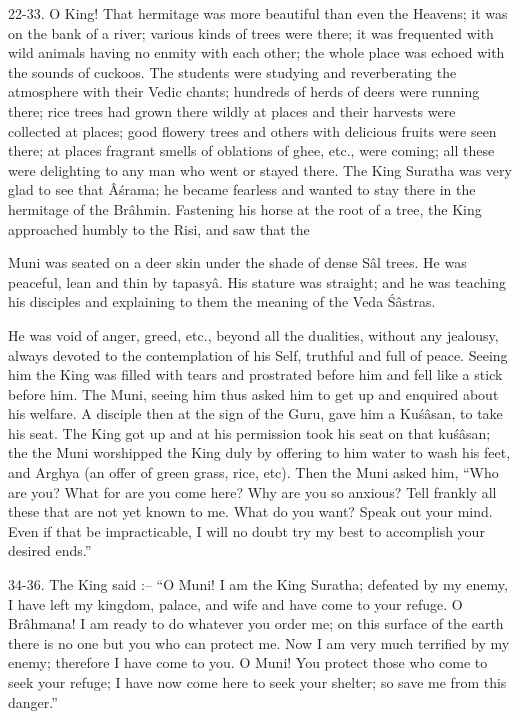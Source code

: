 22-33. O King! That hermitage was more beautiful than even the Heavens; it was on the bank of a river; various kinds of trees were there; it was frequented with wild animals having no enmity with each other; the whole place was echoed with the sounds of cuckoos. The students were studying and reverberating the atmosphere with their Vedic chants; hundreds of herds of deers were running there; rice trees had grown there wildly at places and their harvests were collected at places; good flowery trees and others with delicious fruits were seen there; at places fragrant smells of oblations of ghee, etc., were coming; all these were delighting to any man who went or stayed there. The King Suratha was very glad to see that \^A\'srama; he became fearless and wanted to stay there in the hermitage of the Br\^ahmin. Fastening his horse at the root of a tree, the King approached humbly to the Risi, and saw that the

Muni was seated on a deer skin under the shade of dense S\^al trees. He was peaceful, lean and thin by tapasy\^a. His stature was straight; and he was teaching his disciples and explaining to them the meaning of the Veda \'S\^astras.

He was void of anger, greed, etc., beyond all the dualities, without any jealousy, always devoted to the contemplation of his Self, truthful and full of peace. Seeing him the King was filled with tears and prostrated before him and fell like a stick before him. The Muni, seeing him thus asked him to get up and enquired about his welfare. A disciple then at the sign of the Guru, gave him a Ku\'s\^asan, to take his seat. The King got up and at his permission took his seat on that ku\'s\^asan; the the Muni worshipped the King duly by offering to him water to wash his feet, and Arghya (an offer of green grass, rice, etc). Then the Muni asked him, ``Who are you? What for are you come here? Why are you so anxious? Tell frankly all these that are not yet known to me. What do you want? Speak out your mind. Even if that be impracticable, I will no doubt try my best to accomplish your desired ends.''

34-36. The King said :-- ``O Muni! I am the King Suratha; defeated by my enemy, I have left my kingdom, palace, and wife and have come to your refuge. O Br\^ahmana! I am ready to do whatever you order me; on this surface of the earth there is no one but you who can protect me. Now I am very much terrified by my enemy; therefore I have come to you. O Muni! You protect those who come to seek your refuge; I have now come here to seek your shelter; so save me from this danger.''

